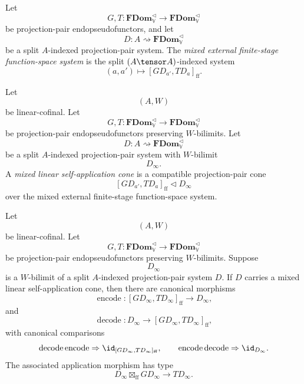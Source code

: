 \begin{definition}
\label{def:mixed-external-finite-stage-function-space-system}
Let
\[
    G,T:\mathbf{FDom}_{\mathbb V}^{\triangleleft}
      \to
      \mathbf{FDom}_{\mathbb V}^{\triangleleft}
\]
be projection-pair endopseudofunctors, and let
\[
    D:A\rightsquigarrow\mathbf{FDom}_{\mathbb V}^{\triangleleft}
\]
be a split \(A\)-indexed projection-pair system.  The
\emph{mixed external finite-stage function-space system} is the split
\((A\tensor A)\)-indexed system
\[
    (a,a')\longmapsto [GD_{a'},TD_a]_{\mathrm{ff}}.
\]
\end{definition}

\begin{definition}
\label{def:mixed-linear-self-application-cone}
Let
\[
    (A,W)
\]
be linear-cofinal.  Let
\[
    G,T:\mathbf{FDom}_{\mathbb V}^{\triangleleft}
      \to
      \mathbf{FDom}_{\mathbb V}^{\triangleleft}
\]
be projection-pair endopseudofunctors preserving \(W\)-bilimits.  Let
\[
    D:A\rightsquigarrow\mathbf{FDom}_{\mathbb V}^{\triangleleft}
\]
be a split \(A\)-indexed projection-pair system with \(W\)-bilimit
\[
    D_\infty.
\]
A \emph{mixed linear self-application cone} is a compatible projection-pair cone
\[
    [GD_{a'},TD_a]_{\mathrm{ff}}
    \triangleleft
    D_\infty
\]
over the mixed external finite-stage function-space system.
\end{definition}

\begin{theorem}
\label{thm:mixed-lax-linear-application}
Let
\[
    (A,W)
\]
be linear-cofinal.  Let
\[
    G,T:\mathbf{FDom}_{\mathbb V}^{\triangleleft}
      \to
      \mathbf{FDom}_{\mathbb V}^{\triangleleft}
\]
be projection-pair endopseudofunctors preserving \(W\)-bilimits.  Suppose
\[
    D_\infty
\]
is a \(W\)-bilimit of a split \(A\)-indexed projection-pair system \(D\).
If \(D\) carries a mixed linear self-application cone, then there are canonical
morphisms
\[
    \operatorname{encode}:[GD_\infty,TD_\infty]_{\mathrm{ff}}\to D_\infty,
\]
and
\[
    \operatorname{decode}:D_\infty\to[GD_\infty,TD_\infty]_{\mathrm{ff}},
\]
with canonical comparisons
\[
    \operatorname{decode}\operatorname{encode}
    \Rightarrow
    \id_{[GD_\infty,TD_\infty]_{\mathrm{ff}}},
    \qquad
    \operatorname{encode}\operatorname{decode}
    \Rightarrow
    \id_{D_\infty}.
\]
The associated application morphism has type
\[
    D_\infty\boxtimes_{\mathrm{ff}}GD_\infty\to TD_\infty.
\]
\end{theorem}

